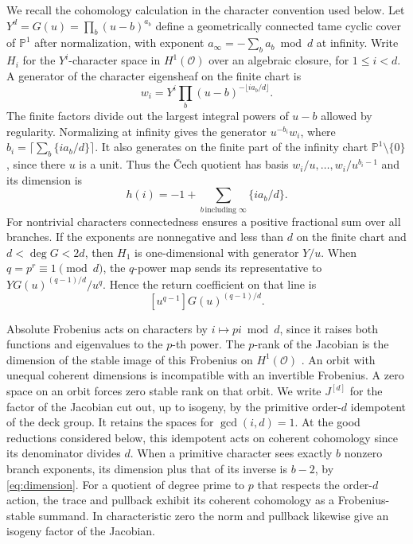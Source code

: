 \documentclass[11pt]{article}
\begin{document}
We recall the cohomology calculation in the character convention used
below. Let \(Y^d=G(u)=\prod_b(u-b)^{a_b}\) define a geometrically
connected tame cyclic cover of \(\mathbb P^1\) after normalization, with
exponent \(a_\infty=-\sum_b a_b\bmod d\) at infinity. Write \(H_i\)
for the \(Y^i\)-character space in \(H^1(\mathcal O)\) over an algebraic
closure, for \(1\le i<d\). A generator of the character eigensheaf
on the finite chart is
\[
       w_i=Y^i\prod_b(u-b)^{-\lfloor ia_b/d\rfloor}.
\]
The finite factors divide out the largest integral powers of \(u-b\)
allowed by regularity. Normalizing at infinity gives the generator
\(u^{-b_i}w_i\), where \(b_i=\lceil\sum_b\{ia_b/d\}\rceil\).
It also generates on the finite part of the infinity chart
\(\mathbb P^1\setminus\{0\}\), since there \(u\) is a unit.
Thus the \v{C}ech quotient has basis \(w_i/u,\ldots,w_i/u^{b_i-1}\)
and its dimension is
\begin{equation}\label{eq:dimension}
       h(i)=-1+\sum_{b\,\text{including }\infty}\{ia_b/d\}.
\end{equation}
For nontrivial characters connectedness ensures a positive fractional
sum over all branches. If the exponents
are nonnegative and less than \(d\) on the finite chart and
\(d<\deg G<2d\), then \(H_1\) is one-dimensional with generator \(Y/u\).
When \(q=p^r\equiv1\pmod d\), the \(q\)-power map sends its representative
to \(YG(u)^{(q-1)/d}/u^q\). Hence the return coefficient on that line is
\begin{equation}\label{eq:return}
                   [u^{q-1}]G(u)^{(q-1)/d}.
\end{equation}

Absolute Frobenius acts on characters by \(i\mapsto pi\bmod d\),
since it raises both functions and eigenvalues to the \(p\)-th power.
The \(p\)-rank of the Jacobian is the dimension of the stable image
of this Frobenius on \(H^1(\mathcal O)\) \cite[\S2]{bouw}.
An orbit with unequal coherent dimensions is incompatible with an
invertible Frobenius. A zero space on an orbit forces zero stable rank
on that orbit. We write \(J^{[d]}\) for the factor of the Jacobian cut
out, up to isogeny, by the primitive order-\(d\) idempotent of the
deck group. It retains the spaces for \(\gcd(i,d)=1\).
At the good reductions considered below, this idempotent acts on
coherent cohomology since its denominator divides \(d\).
When a primitive
character sees exactly \(b\) nonzero branch exponents, its dimension
plus that of its inverse is \(b-2\), by \eqref{eq:dimension}.
For a quotient of degree prime to \(p\) that respects the order-\(d\)
action, the trace and pullback exhibit its coherent cohomology as a
Frobenius-stable summand. In characteristic zero the norm and pullback
likewise give an isogeny factor of the Jacobian.
\end{document}

